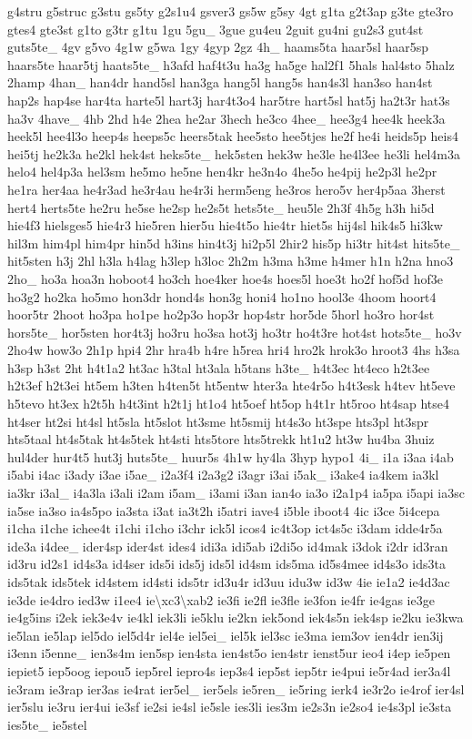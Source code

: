 \begin{DoxyCompactItemize}
g4stru g5struc g3stu gs5ty g2s1u4 gsver3 gs5w g5sy 4gt g1ta g2t3ap g3te gte3ro gtes4 gte3st g1to g3tr g1tu 1gu 5gu\-\_\- 3gue gu4eu 2guit gu4ni gu2s3 gut4st guts5te\-\_\- 4gv g5vo 4g1w g5wa 1gy 4gyp 2gz 4h\-\_\- haams5ta haar5sl haar5sp haars5te haar5tj haats5te\-\_\- h3afd haf4t3u ha3g ha5ge hal2f1 5hals hal4sto 5halz 2hamp 4han\-\_\- han4dr hand5sl han3ga hang5l hang5s han4s3l han3so han4st hap2s hap4se har4ta harte5l hart3j har4t3o4 har5tre hart5sl hat5j ha2t3r hat3s ha3v 4have\-\_\- 4hb 2hd h4e 2hea he2ar 3hech he3co 4hee\-\_\- hee3g4 hee4k heek3a heek5l hee4l3o heep4s heeps5c heers5tak hee5sto hee5tjes he2f he4i heids5p heis4 hei5tj he2k3a he2kl hek4st heks5te\-\_\- hek5sten hek3w he3le he4l3ee he3li hel4m3a helo4 hel4p3a hel3sm he5mo he5ne hen4kr he3n4o 4he5o he4pij he2p3l he2pr he1ra her4aa he4r3ad he3r4au he4r3i herm5eng he3ros hero5v her4p5aa 3herst hert4 herts5te he2ru he5se he2sp he2s5t hets5te\-\_\- heu5le 2h3f 4h5g h3h hi5d hie4f3 hielsges5 hie4r3 hie5ren hier5u hie4t5o hie4tr hiet5s hij4sl hik4s5 hi3kw hil3m him4pl him4pr hin5d h3ins hin4t3j hi2p5l 2hir2 his5p hi3tr hit4st hits5te\-\_\- hit5sten h3j 2hl h3la h4lag h3lep h3loc 2h2m h3ma h3me h4mer h1n h2na hno3 2ho\-\_\- ho3a hoa3n hoboot4 ho3ch hoe4ker hoe4s hoes5l hoe3t ho2f hof5d hof3e ho3g2 ho2ka ho5mo hon3dr hond4s hon3g honi4 ho1no hool3e 4hoom hoort4 hoor5tr 2hoot ho3pa ho1pe ho2p3o hop3r hop4str hor5de 5horl ho3ro hor4st hors5te\-\_\- hor5sten hor4t3j ho3ru ho3sa hot3j ho3tr ho4t3re hot4st hots5te\-\_\- ho3v 2ho4w how3o 2h1p hpi4 2hr hra4b h4re h5rea hri4 hro2k hrok3o hroot3 4hs h3sa h3sp h3st 2ht h4t1a2 ht3ac h3tal ht3ala h5tans h3te\-\_\- h4t3ec ht4eco h2t3ee h2t3ef h2t3ei ht5em h3ten h4ten5t ht5entw hter3a hte4r5o h4t3esk h4tev ht5eve h5tevo ht3ex h2t5h h4t3int h2t1j ht1o4 ht5oef ht5op h4t1r ht5roo ht4sap htse4 ht4ser ht2si ht4sl ht5sla ht5slot ht3sme ht5smij ht4s3o ht3spe hts3pl ht3spr hts5taal ht4s5tak ht4s5tek ht4sti hts5tore hts5trekk ht1u2 ht3w hu4ba 3huiz hul4der hur4t5 hut3j huts5te\-\_\- huur5s 4h1w hy4la 3hyp hypo1 4i\-\_\- i1a i3aa i4ab i5abi i4ac i3ady i3ae i5ae\-\_\- i2a3f4 i2a3g2 i3agr i3ai i5ak\-\_\- i3ake4 ia4kem ia3kl ia3kr i3al\-\_\- i4a3la i3ali i2am i5am\-\_\- i3ami i3an ian4o ia3o i2a1p4 ia5pa i5api ia3sc ia5se ia3so ia4s5po ia3sta i3at ia3t2h i5atri iave4 i5ble iboot4 4ic i3ce 5i4cepa i1cha i1che ichee4t i1chi i1cho i3chr ick5l icos4 ic4t3op ict4s5c i3dam idde4r5a ide3a i4dee\-\_\- ider4sp ider4st ides4 idi3a idi5ab i2di5o id4mak i3dok i2dr id3ran id3ru id2s1 id4s3a id4ser ids5i ids5j ids5l id4sm ids5ma id5s4mee id4s3o ids3ta ids5tak ids5tek id4stem id4sti ids5tr id3u4r id3uu idu3w id3w 4ie ie1a2 ie4d3ac ie3de ie4dro ied3w i1ee4 ie\textbackslash{}xc3\textbackslash{}xab2 ie3fi ie2fl ie3fle ie3fon ie4fr ie4gas ie3ge ie4g5ins i2ek iek3e4v ie4kl iek3li ie5klu ie2kn iek5ond iek4s5n iek4sp ie2ku ie3kwa ie5lan ie5lap iel5do iel5d4r iel4e iel5ei\-\_\- iel5k iel3sc ie3ma iem3ov ien4dr ien3ij i3enn i5enne\-\_\- ien3s4m ien5sp ien4sta ien4st5o ien4str ienst5ur ieo4 i4ep ie5pen iepiet5 iep5oog iepou5 iep5rel iepro4s iep3s4 iep5st iep5tr ie4pui ie5r4ad ier3a4l ie3ram ie3rap ier3as ie4rat ier5el\-\_\- ier5els ie5ren\-\_\- ie5ring ierk4 ie3r2o ie4rof ier4sl ier5slu ie3ru ier4ui ie3sf ie2si ie4sl ie5sle ies3li ies3m ie2s3n ie2so4 ie4s3pl ie3sta ies5te\-\_\- ie5stel 
\end{DoxyCompactItemize}
